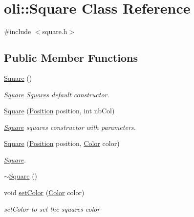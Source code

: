 \hypertarget{classoli_1_1_square}{}\section{oli\+:\+:Square Class Reference}
\label{classoli_1_1_square}


{\ttfamily \#include $<$square.\+h$>$}

\subsection*{Public Member Functions}
\begin{DoxyCompactItemize}
\item 
\hyperlink{classoli_1_1_square_acc031fb00b69ad310d63985481b60ba6}{Square} ()
\begin{DoxyCompactList}\small\item\em \hyperlink{classoli_1_1_square}{Square} \hyperlink{classoli_1_1_square}{Square}\textquotesingle{}s default constructor. \end{DoxyCompactList}\item 
\hyperlink{classoli_1_1_square_a178d27c0b19d746f052355048847645d}{Square} (\hyperlink{classoli_1_1_position}{Position} position, int nb\+Col)
\begin{DoxyCompactList}\small\item\em \hyperlink{classoli_1_1_square}{Square} square\textquotesingle{}s constructor with parameters. \end{DoxyCompactList}\item 
\hyperlink{classoli_1_1_square_a8d8dbadb3451a21672e4485b75638776}{Square} (\hyperlink{classoli_1_1_position}{Position} position, \hyperlink{namespaceoli_aac44697e43b3ab2ad32fe892ab2276eb}{Color} color)
\begin{DoxyCompactList}\small\item\em \hyperlink{classoli_1_1_square}{Square}. \end{DoxyCompactList}\item 
\hyperlink{classoli_1_1_square_ae3a146c140b1c641391cb0a2f3319719}{$\sim$\+Square} ()
\item 
void \hyperlink{classoli_1_1_square_afd04e5d1eaa2e2f2eaab0be32f2d965f}{set\+Color} (\hyperlink{namespaceoli_aac44697e43b3ab2ad32fe892ab2276eb}{Color} color)
\begin{DoxyCompactList}\small\item\em set\+Color to set the square\textquotesingle{}s color \end{DoxyCompactList}\item 

\end{DoxyCompactItemize}
